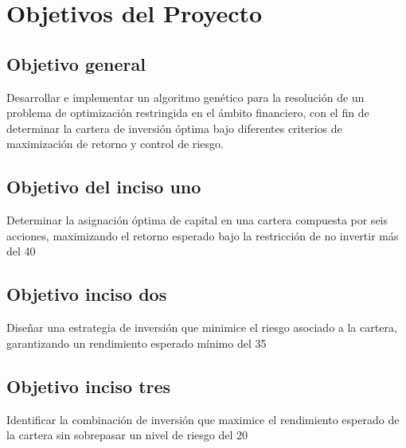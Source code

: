 \chapter{Objetivos del Proyecto}

\section{Objetivo general}
Desarrollar e implementar un algoritmo genético para la resolución de un problema de optimización restringida en el ámbito financiero, con el fin de determinar la cartera de inversión óptima bajo diferentes criterios de maximización de retorno y control de riesgo.

\section{Objetivo del inciso uno}
Determinar la asignación óptima de capital en una cartera compuesta por seis acciones, maximizando el retorno esperado bajo la restricción de no invertir más del 40%

\section{Objetivo inciso dos}
Diseñar una estrategia de inversión que minimice el riesgo asociado a la cartera, garantizando un rendimiento esperado mínimo del 35%

\section{Objetivo inciso tres}
Identificar la combinación de inversión que maximice el rendimiento esperado de la cartera sin sobrepasar un nivel de riesgo del 20%
